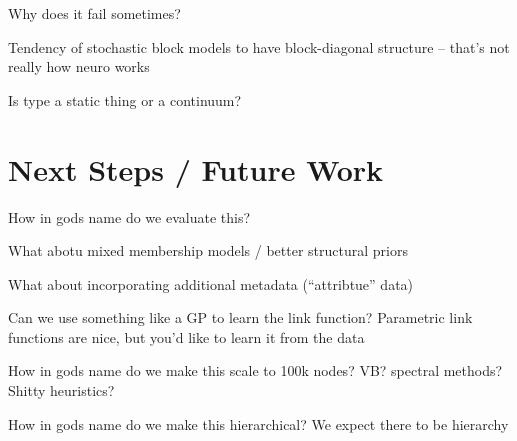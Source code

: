 \documentclass{article}
\begin{document}
Why does it fail sometimes? 

Tendency of stochastic block models to have block-diagonal structure -- that's not really how neuro works

Is type a static thing or a continuum? 


\section{Next Steps / Future Work}
How in gods name do we evaluate this? 

What abotu mixed membership models / better structural priors

What about incorporating additional metadata (``attribtue'' data)

Can we use something like a GP to learn the link function? 
Parametric link functions are nice, but you'd like to learn it from the data

How in gods name do we make this scale to 100k nodes? 
VB? spectral methods? Shitty heuristics? 

How in gods name do we make this hierarchical? 
We expect there to be hierarchy 

\printbibliography
\end{document}
